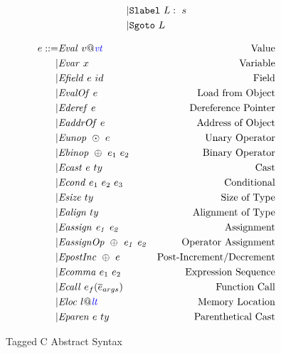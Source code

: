 \documentclass[acmsmall,review,anonymous]{acmart}\settopmatter{printfolios=true,printccs=false,printacmref=false}
\begin{document}
\begin{figure}
\begin{subfigure}[t]{0.3\textwidth}
\[\begin{aligned}
    | & \mathtt{Slabel} ~ L: ~ s \\
    | & \mathtt{Sgoto} ~ L \\    
    \end{aligned}\]
  \end{subfigure}
  \begin{subfigure}[t]{0.69\textwidth}
    \[\begin{aligned}
    \expr ::= & \val{v}{\vt} & \textnormal{Value} \\
    | & \var{x} & \textnormal{Variable} \\
    | & \field{\expr}{id} & \textnormal{Field} \\
    | & \valof{\expr} & \textnormal{Load from Object} \\
    | & \deref{\expr} & \textnormal{Dereference Pointer} \\
    | & \addrof{\expr} & \textnormal{Address of Object} \\
    | & \unop{\odot}{\expr} & \textnormal{Unary Operator} \\
    | & \binop{\oplus}{\expr_1}{\expr_2} & \textnormal{Binary Operator} \\
    | & \cast{\expr}{ty} & \textnormal{Cast} \\
    | & \condition{\expr_1}{\expr_2}{\expr_3} & \textnormal{Conditional} \\
    | & \sizeof{ty} & \textnormal{Size of Type} \\
    | & \alignof{ty} & \textnormal{Alignment of Type} \\
    | & \assign{\expr_1}{\expr_2} & \textnormal{Assignment} \\
    | & \assignop{\oplus}{\expr_1}{\expr_2} & \textnormal{Operator Assignment} \\
    | & \postinc{\oplus}{\expr} & \textnormal{Post-Increment/Decrement} \\
    | & \comma{\expr_1}{\expr_2} & \textnormal{Expression Sequence} \\
    | & \call{\expr_f}{\overline{\expr}_{args}} & \textnormal{Function Call} \\
    | & \loc{l}{\lt} & \textnormal{Memory Location} \\
    | & \paren{\expr}{ty} & \textnormal{Parenthetical Cast} \\
    \end{aligned}\]
  \end{subfigure}
  \caption{Tagged C Abstract Syntax}
  \label{fig:syntax}
\end{figure}
\end{document}
